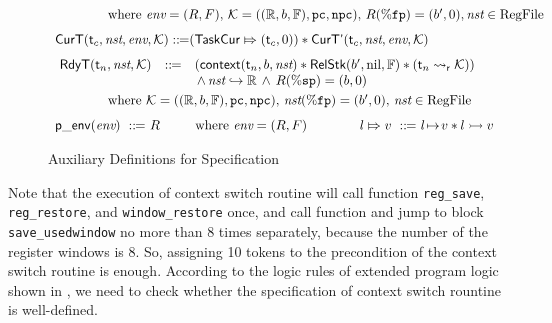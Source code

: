 \begin{figure}[!t]
\[\begin{array}{l}
\begin{array}{lll}
            \end{array}
            \\
            \\[-9pt]
            \qquad\qquad
            \text{where} \ \env = (\RFile, \Wstack), \, 
            \hthrdlocalst = ((\hRfile, \block, \hWstk), \pc, \npc), 
            \, \RFile(\fpreg) = (\block', 0), \nst \in \text{RegFile} \\
            \\[-5pt]
            \RelCurT{\thrdid_c}{\nst}{\env}{\hthrdlocalst} \define 
            (\relmsto{\TaskCur}{(\thrdid_c, 0)}) \sepstar 
            \RelCurTAux{\thrdid_c}{\nst}{\env}{\hthrdlocalst} \\
            \\[-5pt]
            \hspace*{-0.15em}
            \begin{array}{lll}
                \RelRdyT{\thrdid_n}{\nst}{\hthrdlocalst} & \define & 
                (\relcontext{\thrdid_n}{\block}{\nst}
                \sepstar 
                \RelStk{\block'}{\nil}{\hWstk} \sepstar 
                (\astRdyCont{\thrdid_n}{\hthrdlocalst})) \\
                & &  
                \, \land \, 
                \Rinj{\nst}{\hRfile} \, \land \, \RFile(\spreg) = (\block, 0)
            \end{array}  \\
            \\[-9pt]
            \qquad\qquad
            \text{where} \ \hthrdlocalst = ((\hRfile, \block, \hWstk), \pc, \npc), 
            \, \nst(\fpreg) = (\block', 0), \, \nst \in \text{RegFile} \\
            \\[-5pt]
            \pEnv{\env} \ \define \ \RFile \qquad \ \ \text{where} \ \env = (\RFile, \Wstack)
            \qquad\qquad
            \relmsto{\loc}{\val} \ \define \ 
            \msto{\loc}{\val} \sepstar \hmsto{\loc}{\val} 
        \end{array}
    \]
    \caption{Auxiliary Definitions for Specification}
    \label{def:aux-def-spec}
\end{figure}

Note that the execution of context switch routine will 
call function \texttt{reg\_save}, \texttt{reg\_restore}, and  
\texttt{window\_restore} once, and call function  
and jump to block \texttt{save\_usedwindow} no more than 8 times separately, 
because the number of the register windows is 8. So, assigning 10 tokens 
to the precondition of the context switch routine is enough. 
According to the logic rules of extended program logic shown 
in \Fig{\ref{fig:Selected Inference Rules for Refinement Verification}}, 
we need to check whether the specification of context switch rountine 
is well-defined. 

